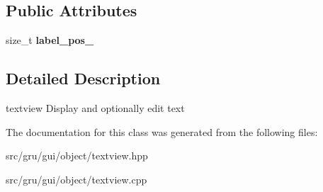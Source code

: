 \subsection*{\-Public \-Attributes}
\begin{DoxyCompactItemize}
\item 
\hypertarget{classglutpp_1_1gui_1_1object_1_1textview_ad71e0b42f2b9068d6ff72b3b92f6ec3e}{size\-\_\-t {\bfseries label\-\_\-pos\-\_\-}}\label{classglutpp_1_1gui_1_1object_1_1textview_ad71e0b42f2b9068d6ff72b3b92f6ec3e}

\end{DoxyCompactItemize}


\subsection{\-Detailed \-Description}
textview \-Display and optionally edit text 

\-The documentation for this class was generated from the following files\-:\begin{DoxyCompactItemize}
\item 
src/gru/gui/object/textview.\-hpp\item 
src/gru/gui/object/textview.\-cpp\end{DoxyCompactItemize}
